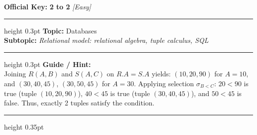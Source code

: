 \documentclass[a4paper,10pt]{article}
\begin{document}
\begin{tcolorbox}
\textbf{Official Key:} \textbf{\large 2 to 2} \hfill \textit{\small [Easy]}
\vspace{2pt}\hrule height 0.3pt\vspace{3pt}
\textbf{Topic:} Databases \\
\textbf{Subtopic:} \textit{Relational model: relational algebra, tuple calculus, SQL}
\vspace{2pt}\hrule height 0.3pt\vspace{3pt}
\textbf{Guide / Hint:} \\
{\small Joining $R(A,B)$ and $S(A,C)$ on $R.A = S.A$ yields: $(10, 20, 90)$ for $A=10$, and $(30, 40, 45)$, $(30, 50, 45)$ for $A=30$. Applying selection $\sigma_{B < C}$: $20 < 90$ is true (tuple $(10, 20, 90)$), $40 < 45$ is true (tuple $(30, 40, 45)$), and $50 < 45$ is false. Thus, exactly 2 tuples satisfy the condition.}

\end{tcolorbox}
\vspace{6pt}\hrule height 0.35pt\vspace{6pt}
\noindent
\end{document}
